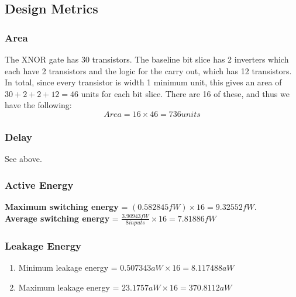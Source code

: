 \documentclass{article}
\begin{document}
\subsection{Design Metrics}

\subsubsection{Area}
The XNOR gate has 30 transistors. The baseline bit slice has 2 inverters which each have 2 transistors and the logic for the carry out, which has 12 transistors. In total, since every transistor is width 1 minimum unit, this gives an area of $30 + 2 + 2 + 12 = 46$ units for each bit slice. There are 16 of these, and thus we have the following:\\
$$Area = 16 \times 46 = 736units$$
\subsubsection{Delay}
See above.

\subsubsection{Active Energy}
\textbf{Maximum switching energy} = $(0.582845fW) \times 16 = 9.32552fW$.\\
\textbf{Average switching energy} = $\frac{3.90943fW}{8 inputs} \times 16 = 7.81886fW$

\subsubsection{Leakage Energy}
\begin{enumerate}
\item Minimum leakage energy = $0.507343aW \times 16 = 8.117488aW$
\item Maximum leakage energy = $23.1757aW \times 16 = 370.8112aW$
\end{enumerate}
\end{document}
